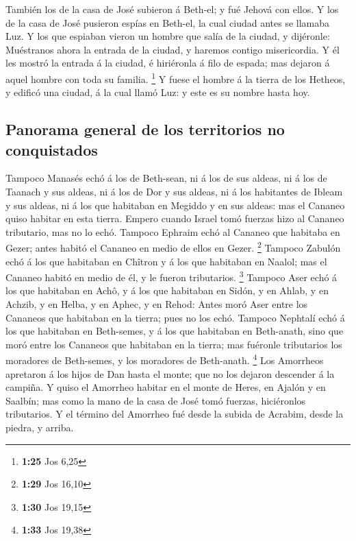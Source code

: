  También los de la casa de José subieron á Beth-el; y fué
Jehová con ellos.  Y los de la casa de José pusieron
espías en Beth-el, la cual ciudad antes se llamaba Luz. 
Y los que espiaban vieron un hombre que salía de la ciudad, y dijéronle:
Muéstranos ahora la entrada de la ciudad, y haremos contigo
misericordia.  Y él les mostró la entrada á la ciudad, é
hiriéronla á filo de espada; mas dejaron á aquel hombre con toda su
familia. \footnote{\textbf{1:25} Jos 6,25}  Y fuese el
hombre á la tierra de los Hetheos, y edificó una ciudad, á la cual llamó
Luz: y este es su nombre hasta hoy.

\hypertarget{panorama-general-de-los-territorios-no-conquistados}{%
\subsection{Panorama general de los territorios no
conquistados}\label{panorama-general-de-los-territorios-no-conquistados}}

 Tampoco Manasés echó á los de Beth-sean, ni á los de sus
aldeas, ni á los de Taanach y sus aldeas, ni á los de Dor y sus aldeas,
ni á los habitantes de Ibleam y sus aldeas, ni á los que habitaban en
Megiddo y en sus aldeas: mas el Cananeo quiso habitar en esta tierra.
 Empero cuando Israel tomó fuerzas hizo al Cananeo
tributario, mas no lo echó.  Tampoco Ephraim echó al
Cananeo que habitaba en Gezer; antes habitó el Cananeo en medio de ellos
en Gezer. \footnote{\textbf{1:29} Jos 16,10}  Tampoco
Zabulón echó á los que habitaban en Chîtron y á los que habitaban en
Naalol; mas el Cananeo habitó en medio de él, y le fueron tributarios.
\footnote{\textbf{1:30} Jos 19,15}  Tampoco Aser echó á
los que habitaban en Achô, y á los que habitaban en Sidón, y en Ahlab, y
en Achzib, y en Helba, y en Aphec, y en Rehod:  Antes
moró Aser entre los Cananeos que habitaban en la tierra; pues no los
echó.  Tampoco Nephtalí echó á los que habitaban en
Beth-semes, y á los que habitaban en Beth-anath, sino que moró entre los
Cananeos que habitaban en la tierra; mas fuéronle tributarios los
moradores de Beth-semes, y los moradores de Beth-anath. \footnote{\textbf{1:33}
  Jos 19,38}  Los Amorrheos apretaron á los hijos de Dan
hasta el monte; que no los dejaron descender á la campiña.
 Y quiso el Amorrheo habitar en el monte de Heres, en
Ajalón y en Saalbín; mas como la mano de la casa de José tomó fuerzas,
hiciéronlos tributarios.  Y el término del Amorrheo fué
desde la subida de Acrabim, desde la piedra, y arriba.

